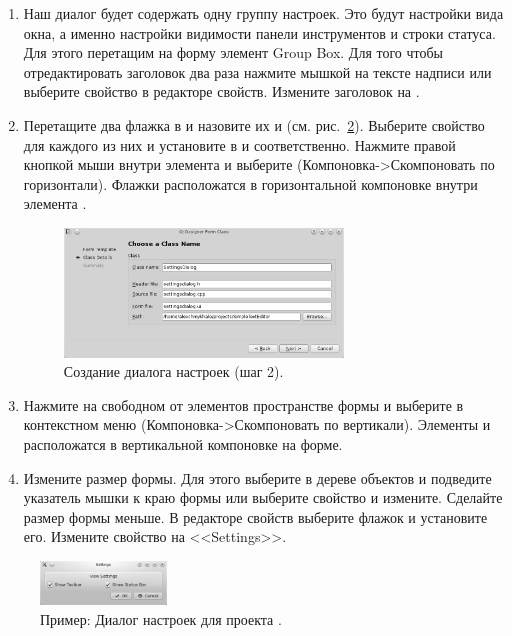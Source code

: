 \begin{enumerate}
\item Наш диалог будет содержать одну группу настроек. Это будут настройки вида окна, а именно настройки видимости
панели инструментов и строки статуса. Для этого перетащим на форму элемент Group Box. Для того чтобы отредактировать
заголовок два раза нажмите мышкой на тексте надписи или выберите свойство  в редакторе свойств.
Измените заголовок на .
\item Перетащите два флажка в  и назовите их  и  (см. рис.~\ref{ch15:refDrawing11}). Выберите свойство  для
каждого из них и установите в  и
 соответственно. Нажмите правой кнопкой мыши внутри элемента 
 и выберите  (Компоновка->Скомпоновать по
горизонтали). Флажки расположатся в горизонтальной компоновке внутри элемента .
\begin{figure}[htb]
\begin{center}
\includegraphics[width=0.7\textwidth]{img/ris_15_11}
\caption[Создание диалога настроек (шаг 2).]{Создание диалога настроек (шаг 2).}
\label{ch15:refDrawing10}
\end{center}
\end{figure}

\item Нажмите на свободном от элементов пространстве формы и выберите в контекстном меню 
 (Компоновка->Скомпоновать по вертикали). 
Элементы  и  расположатся в вертикальной компоновке на форме. 
\item Измените размер формы. Для этого выберите  в дереве объектов и подведите указатель
мышки к краю формы или выберите свойство  и измените. Сделайте размер формы меньше. В редакторе
свойств выберите флажок  и установите его. Измените свойство  на
<<Settings>>. 
\end{enumerate}
\begin{figure}[htb]
\begin{center}
\includegraphics[width=0.3\textwidth]{img/ris_15_12}
\caption[Пример: Диалог настроек для проекта SimpleTextEditor.]{Пример: Диалог настроек для проекта
.}
\label{ch15:refDrawing11}
\end{center}
\end{figure}


